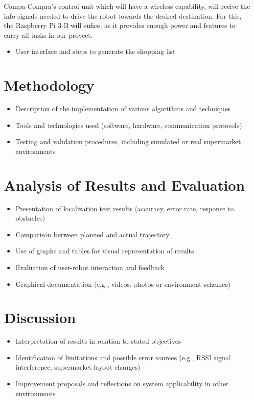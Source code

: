 \documentclass[a4paper,11pt]{article}
\begin{document}
Compa-Compra's control unit which will have a wireless capability, will recive the info-signals 
needed to drive the robot towards the desired destination. For this, the Raspberry Pi 3-B will sufice,
as it provides enough power and features to carry all tasks in our proyect.


\begin{itemize}
\item User interface and steps to generate the shopping list
\end{itemize}

\section{Methodology}
\begin{itemize}
\item Description of the implementation of various algorithms and techniques
\item Tools and technologies used (software, hardware, communication protocols)
\item Testing and validation procedures, including simulated or real supermarket environments
\end{itemize}

\section{Analysis of Results and Evaluation}
\begin{itemize}
\item Presentation of localization test results (accuracy, error rate, response to obstacles)
\item Comparison between planned and actual trajectory
\item Use of graphs and tables for visual representation of results
\item Evaluation of user-robot interaction and feedback
\item Graphical documentation (e.g., videos, photos or environment schemes)
\end{itemize}

\section{Discussion}
\begin{itemize}
\item Interpretation of results in relation to stated objectives
\item Identification of limitations and possible error sources (e.g., RSSI signal interference, supermarket layout changes)
\item Improvement proposals and reflections on system applicability in other environments
\end{itemize}
\end{document}
